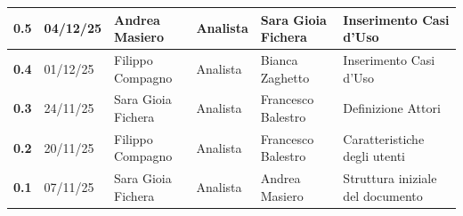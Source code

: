 \documentclass[a4paper,12pt]{article}
\begin{document}
{\begin{table}[h!]
\begin{tabularx}{\textwidth}{|l|l|l|l|L|L|}
                \hline
                \textbf{0.5} & 04/12/25 & Andrea Masiero & Analista & Sara Gioia Fichera & Inserimento Casi d'Uso \\
                \hline
                \textbf{0.4} & 01/12/25 & Filippo Compagno & Analista & Bianca Zaghetto & Inserimento Casi d'Uso \\
                \hline
                \textbf{0.3} & 24/11/25 & Sara Gioia Fichera & Analista & Francesco Balestro &  Definizione Attori \\
                \hline
                \textbf{0.2} & 20/11/25 & Filippo Compagno & Analista & Francesco Balestro & Caratteristiche degli utenti \\
                \hline
                \textbf{0.1} & 07/11/25 & Sara Gioia Fichera & Analista & Andrea Masiero & Struttura iniziale del documento \\
                \hline
            \end{tabularx}
        \end{table}
    }
    \newpage
    
    \tableofcontents
    \newpage

    \listoffigures
    \newpage
    
    \listoftables
    \newpage
\end{document}
